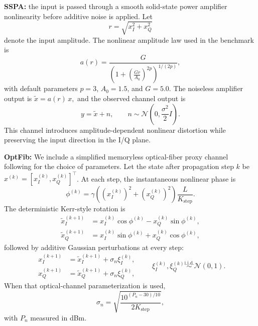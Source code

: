 \documentclass[conference]{IEEEtran}
\begin{document}
\textbf{SSPA:}
the input is passed through a smooth solid-state power amplifier nonlinearity before additive noise is applied.
Let
\begin{equation}
r = \sqrt{x_I^2 + x_Q^2}
\end{equation}
denote the input amplitude.
The nonlinear amplitude law used in the benchmark is
\begin{equation}
a(r)
=
\frac{G}{\left(1+\left(\frac{Gr}{A_0}\right)^{2p}\right)^{1/(2p)}},
\end{equation}
with default parameters \(p=3\), \(A_0=1.5\), and \(G=5.0\).
The noiseless amplifier output is $\tilde{x} = a(r)\,x,$
and the observed channel output is
\begin{equation}
y = \tilde{x} + n,
\qquad
n \sim \mathcal{N}\!\left(0,\frac{\sigma^2}{2}I\right).
\end{equation}
This channel introduces amplitude-dependent nonlinear distortion while preserving the input direction in the I/Q plane.

\textbf{OptFib:}
We include a simplified memoryless optical-fiber proxy channel following \cite{li2018e2efiber} for the choice of parameters.
Let the state after propagation step \(k\) be \(x^{(k)} = [x_I^{(k)},x_Q^{(k)}]^\top\).
At each step, the instantaneous nonlinear phase is
\begin{equation}
\phi^{(k)}
=
\gamma
\left(\left(x_I^{(k)}\right)^2 + \left(x_Q^{(k)}\right)^2\right)\frac{L}{K_{\text{step}}}.
\end{equation}
The deterministic Kerr-style rotation is
\begin{equation}
\begin{aligned}
\tilde{x}_I^{(k+1)} &= x_I^{(k)}\cos\phi^{(k)} - x_Q^{(k)}\sin\phi^{(k)}, \\
\tilde{x}_Q^{(k+1)} &= x_I^{(k)}\sin\phi^{(k)} + x_Q^{(k)}\cos\phi^{(k)},
\end{aligned}
\end{equation}
followed by additive Gaussian perturbations at every step:
\begin{equation}
\begin{aligned}
x_I^{(k+1)} &= \tilde{x}_I^{(k+1)} + \sigma_n \xi_I^{(k)}, \\
x_Q^{(k+1)} &= \tilde{x}_Q^{(k+1)} + \sigma_n \xi_Q^{(k)},
\end{aligned}
\qquad
\xi_I^{(k)},\xi_Q^{(k)} \overset{\text{i.i.d.}}{\sim} \mathcal{N}(0,1).
\end{equation}
When that optical-channel parameterization is used,
\begin{equation}
\sigma_n
=
\sqrt{\frac{10^{(P_n-30)/10}}{2K_{\text{step}}}},
\end{equation}
with \(P_n\) measured in dBm.
\end{document}
